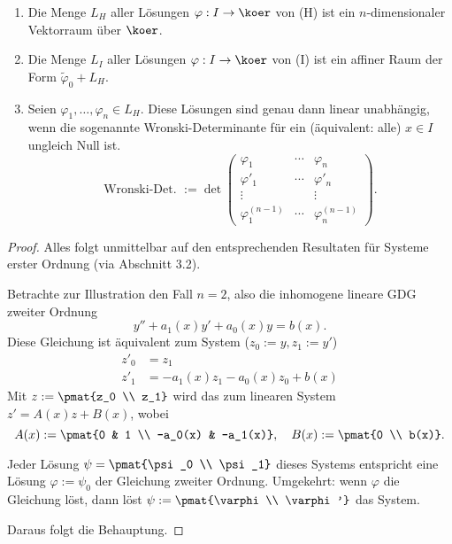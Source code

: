 \begin{thm}
  \begin{enumerate}
    \item Die Menge $L_H$ aller Lösungen $\varphi:I \to \koer$ von (H) ist ein
      $n$-dimensionaler Vektorraum über $\koer$.
    \item Die Menge $L_I$ aller Lösungen $\varphi:I \to \koer$ von (I) ist ein
      affiner Raum der Form $\tilde{\varphi}_0 + L_H$.
    \item Seien $\varphi_1, \ldots, \varphi_n \in L_H$. Diese Lösungen sind
      genau dann linear unabhängig, wenn die sogenannte Wronski-Determinante für
      ein (äquivalent: alle) $x \in I$ ungleich Null ist.
      \[ \text{Wronski-Det. } := \det
        \begin{pmatrix}
          \varphi_1 & \cdots & \varphi_n \\
          \varphi'_1 & \cdots & \varphi'_n \\
          \vdots & & \vdots  \\
          \varphi^{(n-1)}_1 & \cdots & \varphi^{(n-1)}_n 
        \end{pmatrix}. \]
    \end{enumerate}
  \end{thm}

  \begin{proof}
    Alles folgt unmittelbar auf den entsprechenden Resultaten für Systeme erster
    Ordnung (via Abschnitt 3.2).

    Betrachte zur Illustration den Fall $n=2$, also die inhomogene lineare GDG
    zweiter Ordnung
    \[ y'' + a_1(x) y' + a_0(x) y = b(x). \]
    Diese Gleichung ist äquivalent zum System ($z_0 := y, z_1 := y'$)
    \[ \begin{aligned}
        z'_0 &= z_1 \\
        z'_1 &= -a_1(x) z_1 - a_0(x) z_0 + b(x) 
      \end{aligned} \]
    Mit $z := \pmat{z_0 \\ z_1}$ wird das zum linearen System $z' = A(x) z +
    B(x)$, wobei
    \[ A(x) := \pmat{0 & 1 \\ -a_0(x) & -a_1(x)}, \quad B(x) := \pmat{0 \\
        b(x)}.\]

    Jeder Lösung $\psi = \pmat{\psi_0 \\ \psi_1}$ dieses Systems entspricht eine
    Lösung $\varphi := \psi_0$ der Gleichung zweiter Ordnung. Umgekehrt: wenn
    $\varphi$ die Gleichung löst, dann löst $\psi := \pmat{\varphi \\ \varphi'}$
    das System.

    Daraus folgt die Behauptung.
  \end{proof}

